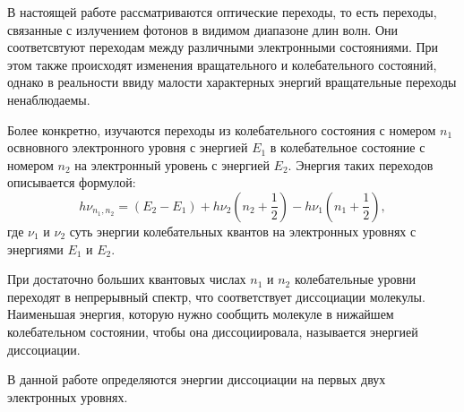         В настоящей работе рассматриваются оптические переходы, то есть переходы, связанные с излучением фотонов в видимом диапазоне длин волн. Они соответсвтуют переходам между различными электронными состояниями. При этом также происходят изменения вращательного и колебательного состояний, однако в реальности ввиду малости характерных энергий вращательные переходы ненаблюдаемы.

        Более конкретно, изучаются переходы из колебательного состояния с номером $n_1$ освновного электронного уровня с энергией $E_1$ в колебательное состояние с номером $n_2$ на электронный уровень с энергией $E_2$. Энергия таких переходов описывается формулой:
        \begin{equation}
            h \nu_{n_1,n_2}=(E_2-E_1)+h\nu_2(n_2+\dfrac{1}{2})-h \nu_1(n_1+\dfrac{1}{2}),
        \end{equation}
        где $\nu_1$ и $\nu_2$ суть энергии колебательных квантов на электронных уровнях с энергиями $E_1$ и $E_2$.

        При достаточно больших квантовых числах $n_1$ и $n_2$ колебательные уровни переходят в непрерывный спектр, что соответствует диссоциации молекулы. Наименьшая энергия, которую нужно сообщить молекуле в нижайшем колебательном состоянии, чтобы она диссоциировала, называется энергией диссоциации.

        В данной работе определяются энергии диссоциации на первых двух электронных уровнях.
     